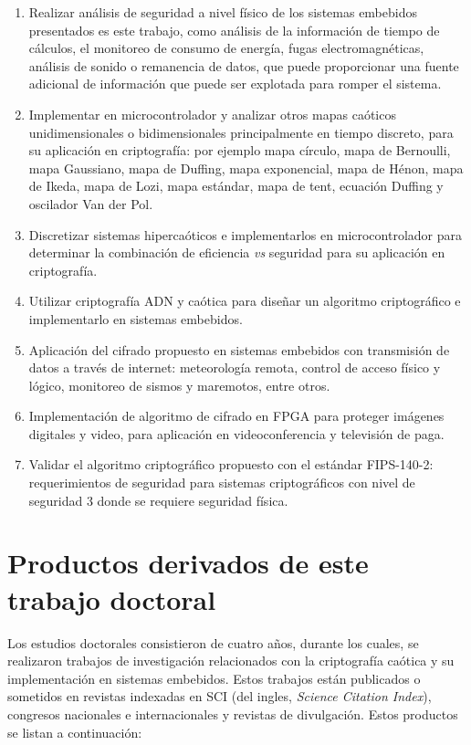 \begin{enumerate}
\item Realizar análisis de seguridad a nivel físico de los sistemas embebidos presentados es este trabajo, como análisis de la información de tiempo de cálculos, el monitoreo de consumo de energía, fugas electromagnéticas, análisis de sonido o remanencia de datos, que puede proporcionar una fuente adicional de información que puede ser explotada para romper el sistema. 

\item Implementar en microcontrolador y analizar otros mapas caóticos unidimensionales o bidimensionales principalmente en tiempo discreto, para su aplicación en criptografía: por ejemplo mapa círculo, mapa de Bernoulli, mapa Gaussiano, mapa de Duffing, mapa exponencial, mapa de Hénon, mapa de Ikeda, mapa de Lozi, mapa estándar, mapa de tent, ecuación Duffing y oscilador Van der Pol.

\item Discretizar sistemas hipercaóticos e implementarlos en microcontrolador para determinar la combinación de eficiencia \textit{vs} seguridad para su aplicación en criptografía.

\item Utilizar criptografía ADN y caótica para diseñar un algoritmo criptográfico e implementarlo en sistemas embebidos.

\item Aplicación del cifrado propuesto en sistemas embebidos con transmisión de datos a través de internet: meteorología remota, control de acceso físico y lógico, monitoreo de sismos y maremotos, entre otros.

\item Implementación de algoritmo de cifrado en FPGA para proteger imágenes digitales y video, para aplicación en videoconferencia y televisión de paga.

\item Validar el algoritmo criptográfico propuesto con el estándar FIPS-140-2: requerimientos de seguridad para sistemas criptográficos con nivel de seguridad 3 donde se requiere seguridad física.
   
\end{enumerate}

\section{Productos derivados de este trabajo doctoral}
Los estudios doctorales consistieron de cuatro años, durante los cuales, se realizaron trabajos de investigación relacionados con la criptografía caótica y su implementación en sistemas embebidos. Estos trabajos están publicados o sometidos en revistas indexadas en SCI (del ingles, \textit{Science Citation Index}), congresos nacionales e internacionales y revistas de divulgación. Estos productos se listan a continuación: \\

